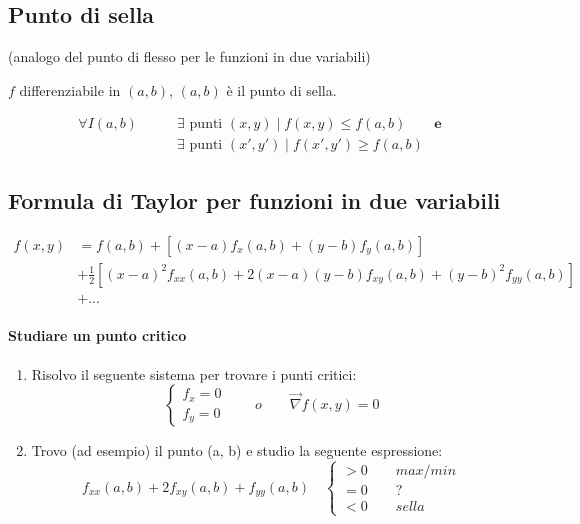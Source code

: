 \documentclass[10pt,a4paper,fleqn]{article}
\begin{document}
	\subsection{Punto di sella} (analogo del punto di flesso per le funzioni in due variabili)

	$f$ differenziabile in $(a, b)$, $(a, b)$ è il punto di sella.
	
	\begin{equation}
	\begin{split}
	\forall I(a, b) \qquad &\exists \text{ punti } (x, y) \mid f(x, y) \leq f(a, b)\qquad \mathbf{e}\\
	&\exists \text{ punti } (x', y') \mid f(x', y') \geq f(a, b)
	\end{split}
	\end{equation}
	
	\subsection{Formula di Taylor per funzioni in due variabili}

	\begin{equation}
	\begin{split}
	f(x, y) &= f(a, b) + \left[(x-a)f_x(a, b) + (y-b)f_y(a, b) \right]\\ &+ \frac{1}{2}\left[(x-a)^2 f_{xx}(a, b) + 2(x-a)(y-b)f_{xy}(a, b) + (y-b)^2 f_{yy}(a, b)\right]\\ &+ ...
	\end{split}
	\end{equation}
	\paragraph{Studiare un punto critico}
	\begin{enumerate}
	\item Risolvo il seguente sistema per trovare i punti critici:
		\begin{equation}
			\begin{cases}
			f_x=0 \\ f_y=0
			\end{cases}
			\qquad o \qquad \vec{\nabla}f(x,y)=0
		\end{equation}
	\item Trovo (ad esempio) il punto (a, b) e studio la seguente espressione:
	\begin{equation}
	f_{xx}(a,b) + 2f_{xy}(a,b) + f_{yy}(a,b) \quad
	\begin{cases}
	> 0 \qquad \textit{max/min} \\ = 0 \qquad ? \\ < 0 \qquad \textit{sella}
	\end{cases}
	\end{equation}
	\end{enumerate}
\end{document}
